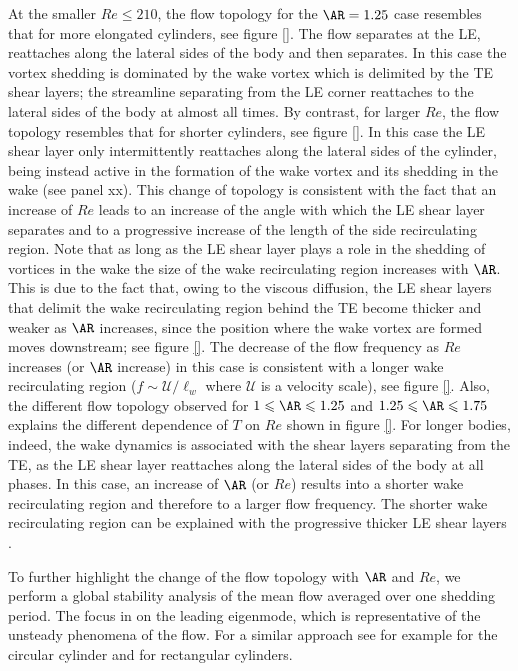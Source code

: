 At the smaller $Re \le 210$, the flow topology for the $\AR=1.25$ case resembles that for more elongated cylinders, see figure \ref{}. The flow separates at the LE, reattaches along the lateral sides of the body and then separates. In this case the vortex shedding is dominated by the wake vortex which is delimited by the TE shear layers; the streamline separating from the LE corner reattaches to the lateral sides of the body at almost all times. By contrast, for larger $Re$, the flow topology resembles that for shorter cylinders, see figure \ref{}. In this case the LE shear layer only intermittently reattaches along the lateral sides of the cylinder, being instead active in the formation of the wake vortex and its shedding in the wake (see panel xx). This change of topology is consistent with the fact that an increase of $Re$ leads to an increase of the angle with which the LE shear layer separates and to a progressive increase of the length of the side recirculating region. Note that as long as the LE shear layer plays a role in the shedding of vortices in the wake the size of the wake recirculating region increases with $\AR$. This is due to the fact that, owing to the viscous diffusion, the LE shear layers that delimit the wake recirculating region behind the TE become thicker and weaker as $\AR$ increases, since the position where the wake vortex are formed moves downstream; see figure \ref{}. The decrease of the flow frequency as $Re$ increases (or $\AR$ increase) in this case is consistent with a longer wake recirculating region ($f \sim \mathcal{U}/\ell_w$ where $\mathcal{U}$ is a velocity scale), see figure \ref{}. Also, the different flow topology observed for $1 \le \AR \le 1.25$ and $1.25 \le \AR \le 1.75$ explains the different dependence of $T$ on $Re$ shown in figure \ref{}. For longer bodies, indeed, the wake dynamics is associated with the shear layers separating from the TE, as the LE shear layer reattaches along the lateral sides of the body at all phases. In this case, an increase of $\AR$ (or $Re$) results into a shorter wake recirculating region and therefore to a larger flow frequency. The shorter wake recirculating region can be explained with the progressive thicker LE shear layers \citep{chiarini-quadrio-auteri-2021}.  

To further highlight the change of the flow topology with $\AR$ and $Re$, we perform a global stability analysis of the mean flow averaged over one shedding period. The focus in on the leading eigenmode, which is representative of the unsteady phenomena of the flow. For a similar approach see for example \cite{pier-2002,barkley-2006} for the circular cylinder and \cite{chiarini-quadrio-auteri-2022} for rectangular cylinders. 

